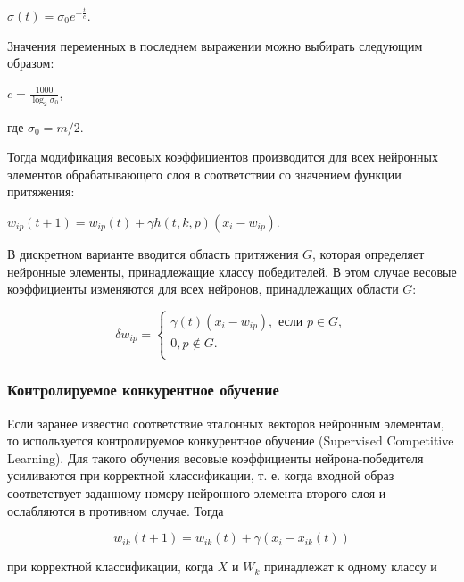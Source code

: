 \documentclass[bachelor, och, referat]{template}
\begin{document}
\begin{center}
    $\sigma(t) = \sigma_0 e^{-\frac{t}{c}}$.
\end{center}

Значения переменных в последнем выражении можно выбирать следующим образом:

\begin{center}
    $c = \frac{1000}{\log_2{\sigma_0}}$,
\end{center}
где $\sigma_0 = m / 2$.

Тогда модификация весовых коэффициентов производится для всех
нейронных элементов обрабатывающего слоя в соответствии со 
значением функции притяжения:

\begin{center}
    $w_{ip}(t + 1) = w_{ip}(t) + \gamma h(t, k, p)(x_i - w_{ip})$.
\end{center}

В дискретном варианте вводится область притяжения $G$, которая
определяет нейронные элементы, принадлежащие классу победителей.
В этом случае весовые коэффициенты изменяются для всех нейронов,
принадлежащих области $G$:

\begin{equation*}
    \delta w_{ip} = 
    \begin{cases}
        \gamma(t)(x_i - w_{ip}), \text{ если } p \in G, \\
        0, p \notin G. \\
    \end{cases}
\end{equation*}


\subsubsection{Контролируемое конкурентное обучение}

Если заранее известно соответствие эталонных векторов нейронным
элементам, то используется контролируемое конкурентное обучение (Supervised 
Competitive Learning). Для такого обучения весовые коэффициенты 
нейрона-победителя усиливаются при корректной классификации, т. е.
когда входной образ соответствует заданному номеру нейронного элемента
второго слоя и ослабляются в противном случае. Тогда

\begin{equation*}
    w_{ik}(t + 1) = w_{ik}(t) + \gamma(x_i - x_{ik}(t))
\end{equation*}

при корректной классификации, когда $X$ и $W_k$ принадлежат к одному
классу и
\end{document}
